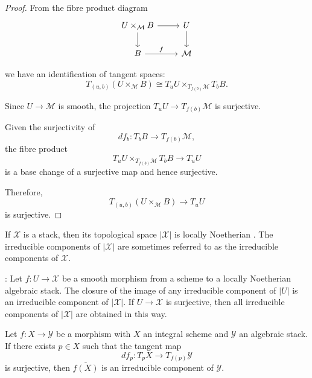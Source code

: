 \documentclass{amsart}
\begin{document}
\begin{proof}  
From the fibre product diagram
\[
\begin{tikzcd}
U \times_{\mathcal{M}} B \arrow[r] \arrow[d] & U \arrow[d] \\
B \arrow[r, "f"] & \mathcal{M}
\end{tikzcd}
\]

we have an identification of tangent spaces:
\[
T_{(u,b)}(U \times_{\mathcal{M}} B) \cong T_u U \times_{T_{f(b)} \mathcal{M}} T_b B.
\]

Since \( U \to \mathcal{M} \) is smooth, the projection \( T_u U \to T_{f(b)} \mathcal{M} \) is surjective.

Given the surjectivity of
\[
df_b: T_b B \to T_{f(b)} \mathcal{M},
\]
the fibre product
\[
T_u U \times_{T_{f(b)} \mathcal{M}} T_b B \to T_u U
\]
is a base change of a surjective map and hence surjective.

Therefore,
\[
T_{(u,b)}(U \times_{\mathcal{M}} B) \to T_u U
\]
is surjective. 
\end{proof}
If $\mathcal{X}$ is a stack, then its topological space $|\mathcal{X}|$ \cite[Tag 04Y8]{stacks-project} is locally Noetherian \cite[Tag 0DQI]{stacks-project}. The irreducible
components of $|\mathcal{X}|$ are sometimes referred to as the irreducible components of $\mathcal{X}$.

\begin{lemma}\label{lemma:irreducible-components}\textnormal{ \cite[Tag 0DR5]{stacks-project}:}
Let \(f : U \rightarrow \mathcal{X}\) be a smooth morphism from a scheme to a locally Noetherian algebraic stack. The closure of the image of any irreducible component of \(|U|\) is an irreducible component of \(|\mathcal{X}|\). If \(U \rightarrow \mathcal{X}\) is surjective, then all irreducible components of \(|\mathcal{X}|\) are obtained in this way.
\end{lemma}
\begin{theorem}\label{thm:irreducible_component}
Let \( f: X \to \mathcal{Y} \) be a morphism with \( X \) an integral scheme and \(\mathcal{Y}\) an algebraic stack. If there exists \( p \in X \) such that the tangent map
\[
df_p: T_p X \to T_{f(p)} \mathcal{Y}
\]
is surjective, then \( \overline{f(X)} \) is an irreducible component of \(\mathcal{Y}\).
\end{theorem}
\end{document}
